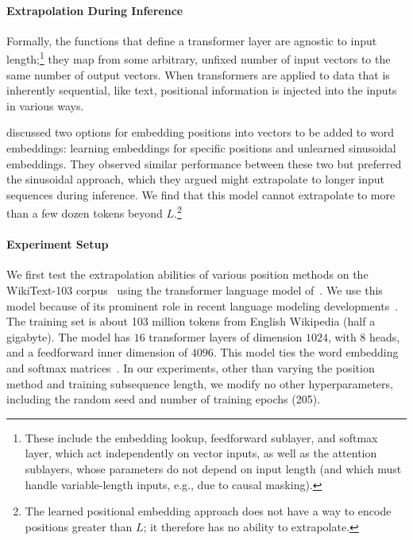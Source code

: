\paragraph{Extrapolation During Inference} 
Formally, the functions that define a transformer layer are agnostic to input length;\footnote{These include the embedding lookup, feedforward sublayer, and softmax layer, which act independently on vector inputs, as well as the attention sublayers, whose parameters do not depend on input length (and which must handle variable-length inputs, e.g., due to causal masking).  %
} they map from some arbitrary, unfixed number of input vectors to the same number of output vectors.  When transformers are applied to data that is inherently sequential, like text, %
positional information is injected into the inputs in various ways. 




\citet{vaswani}
discussed two options for embedding positions into vectors to be added to word %
embeddings:  learning embeddings for specific positions and unlearned sinusoidal embeddings.  They observed similar performance between these two but preferred the sinusoidal approach, which they argued might extrapolate to longer input sequences during inference.  %
We find that this model cannot extrapolate to more than a few dozen tokens beyond $L$.\footnote{The learned positional embedding approach does not have a way to encode positions greater than $L$; it therefore has no ability to extrapolate.}






\paragraph{Experiment Setup}
We first test the extrapolation abilities of various position methods on the WikiText-103 corpus~\citep{pointer} using the transformer language model of~\cite{baevski}. 
We use this model because of its prominent role in recent  language modeling developments~\citep{khandelwal20generalization, shortformer}. The training set is about 103 million tokens from  English Wikipedia (half a gigabyte).  The  model has $16$ transformer layers of dimension $1024$, with $8$ heads, and a feedforward inner dimension of $4096$. This model ties the word embedding and softmax matrices~\citep{tying, inan2017}. %
In our experiments, other than varying the position method and training subsequence length, we modify no other hyperparameters, including the random seed and number of training epochs (205). 



